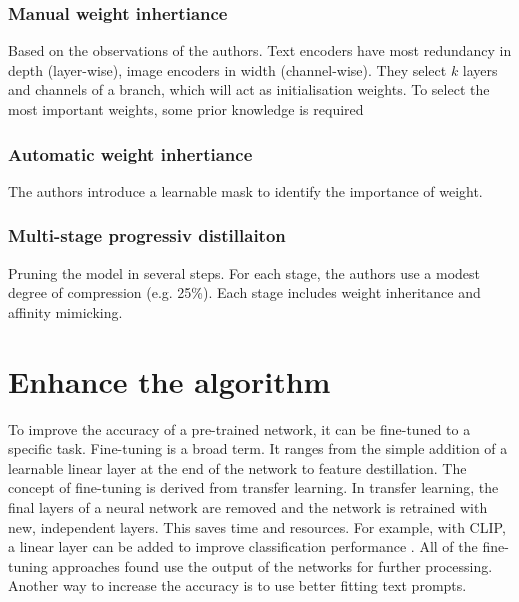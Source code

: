         \subsubsection{Manual weight inhertiance}
        Based on the observations of the authors.
        Text encoders have most redundancy in depth (layer-wise), image encoders in width (channel-wise).
        They select \(k\) layers and channels of a branch, which will act as initialisation weights.
        To select the most important weights, some prior knowledge is required

        \subsubsection{Automatic weight inhertiance}
        The authors introduce a learnable mask to identify the importance of weight.

        \subsubsection{Multi-stage progressiv distillaiton}
        Pruning the model in several steps.
        For each stage, the authors use a modest degree of compression (e.g. 25\%). Each stage includes weight inheritance and affinity mimicking.


\section{Enhance the algorithm}

    To improve the accuracy of a pre-trained network, it can be fine-tuned to a specific task.
    Fine-tuning is a broad term.
    It ranges from the simple addition of a learnable linear layer at the end of the network to feature destillation.
    The concept of fine-tuning is derived from transfer learning\cite{transferlearning}.
    In transfer learning, the final layers of a neural network are removed and the network is retrained with new, independent layers.
    This saves time and resources.
    For example, with CLIP, a linear layer can be added to improve classification performance \cite{finetuneclip}.
    All of the fine-tuning approaches found use the output of the networks for further processing.
    Another way to increase the accuracy is to use better fitting text prompts.

